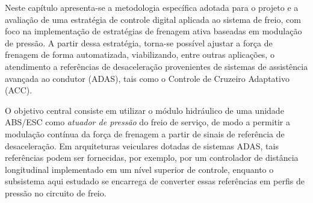 

Neste capítulo apresenta-se a metodologia específica adotada para o projeto e a avaliação de uma estratégia de controle digital aplicada ao sistema de freio, com foco na implementação de estratégias de frenagem ativa baseadas em modulação de pressão. A partir dessa estratégia, torna-se possível ajustar a força de frenagem de forma automatizada, viabilizando, entre outras aplicações, o atendimento a referências de desaceleração provenientes de sistemas de assistência avançada ao condutor (ADAS), tais como o Controle de Cruzeiro Adaptativo (ACC).

O objetivo central consiste em utilizar o módulo hidráulico de uma unidade ABS/ESC como \emph{atuador de pressão} do freio de serviço, de modo a permitir a modulação contínua da força de frenagem a partir de sinais de referência de desaceleração. Em arquiteturas veiculares dotadas de sistemas ADAS, tais referências podem ser fornecidas, por exemplo, por um controlador de distância longitudinal implementado em um nível superior de controle, enquanto o subsistema aqui estudado se encarrega de converter essas referências em perfis de pressão no circuito de freio.

